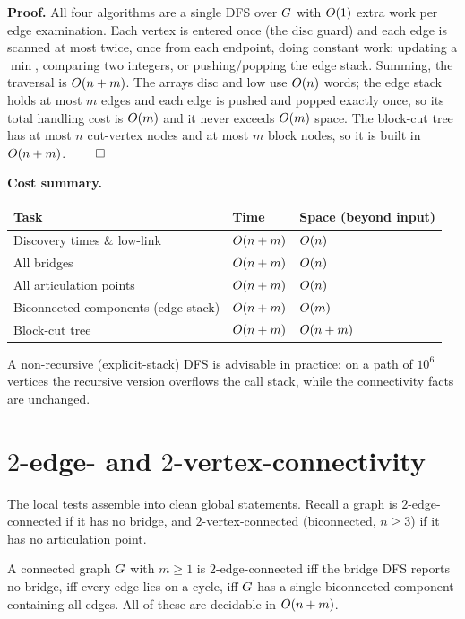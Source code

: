 \begin{formalbox}
\textbf{Proof.} All four algorithms are a single DFS over $G$ with $O(1)$ extra
work per edge examination. Each vertex is entered once (the $\mathrm{disc}$ guard) and
each edge is scanned at most twice, once from each endpoint, doing constant work:
updating a $\min$, comparing two integers, or pushing/popping the edge stack. Summing,
the traversal is $O(n+m)$. The arrays $\mathrm{disc}$ and $\mathrm{low}$ use $O(n)$
words; the edge stack holds at most $m$ edges and each edge is pushed and popped exactly
once, so its total handling cost is $O(m)$ and it never exceeds $O(m)$ space. The
block-cut tree has at most $n$ cut-vertex nodes and at most $m$ block nodes, so it is
built in $O(n+m)$. $\qed$
\end{formalbox}

\begin{complexitybox}
\textbf{Cost summary.}
\begin{center}
\begin{tabular}{lll}
\toprule
Task & Time & Space (beyond input)\\
\midrule
Discovery times \& low-link & $O(n+m)$ & $O(n)$\\
All bridges & $O(n+m)$ & $O(n)$\\
All articulation points & $O(n+m)$ & $O(n)$\\
Biconnected components (edge stack) & $O(n+m)$ & $O(m)$\\
Block-cut tree & $O(n+m)$ & $O(n+m)$\\
\bottomrule
\end{tabular}
\end{center}
A non-recursive (explicit-stack) DFS is advisable in practice: on a path of $10^6$
vertices the recursive version overflows the call stack, while the connectivity facts
are unchanged.
\end{complexitybox}

\section{$2$-edge- and $2$-vertex-connectivity}
\label{ch10:2conn}

The local tests assemble into clean global statements. Recall a graph is
$2$-edge-connected if it has no bridge, and $2$-vertex-connected (biconnected, $n\ge3$)
if it has no articulation point.

\begin{corollary}
\label{ch10:cor-2ec}
A connected graph $G$ with $m\ge1$ is $2$-edge-connected iff the bridge DFS reports
no bridge, iff every edge lies on a cycle, iff $G$ has a single biconnected
component containing all edges. All of these are decidable in $O(n+m)$.
\end{corollary}

